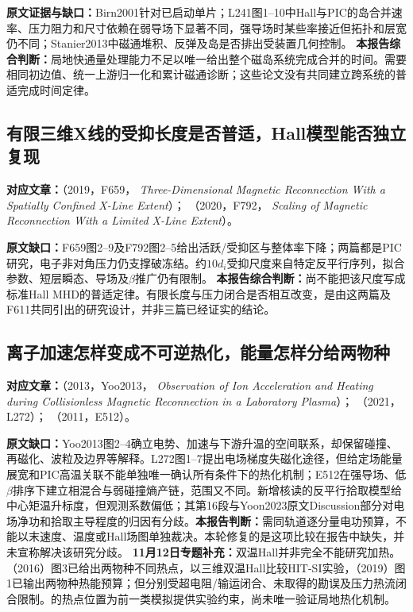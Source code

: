 \textbf{原文证据与缺口：}Birn2001针对已启动单片；L241图1--10中Hall与PIC的岛合并速率、压力阻力和尺寸依赖在弱导场下显著不同，强导场时某些率接近但拓扑和层宽仍不同；Stanier2013中磁通堆积、反弹及岛是否排出受装置几何控制。
\textbf{本报告综合判断：}局地快通量处理能力不足以唯一给出整个磁岛系统完成合并的时间。需要相同初边值、统一上游归一化和累计磁通诊断；这些论文没有共同建立跨系统的普适完成时间定律。

\subsection{有限三维X线的受抑长度是否普适，Hall模型能否独立复现}
\textbf{对应文章：}\citet{F659}（2019，F659，
\emph{Three-Dimensional Magnetic Reconnection With a Spatially Confined X-Line Extent}）；
\citet{F792}（2020，F792，
\emph{Scaling of Magnetic Reconnection With a Limited X-Line Extent}）。

\textbf{原文缺口：}F659图2--9及F792图2--5给出活跃/受抑区与整体率下降；两篇都是PIC研究，电子非对角压力仍支撑破冻结。约$10d_i$受抑尺度来自特定反平行序列，拟合参数、短层瞬态、导场及$\beta$推广仍有限制。
\textbf{本报告综合判断：}尚不能把该尺度写成标准Hall MHD的普适定律。有限长度与压力闭合是否相互改变，是由这两篇及F611共同引出的研究设计，并非三篇已经证实的结论。\citep{F611}

\subsection{离子加速怎样变成不可逆热化，能量怎样分给两物种}
\textbf{对应文章：}\citet{Yoo2013}（2013，Yoo2013，
\emph{Observation of Ion Acceleration and Heating during Collisionless Magnetic Reconnection in a Laboratory Plasma}）；
\citet{L272}（2021，L272）；
\citet{E512}（2011，E512）。

\textbf{原文缺口：}Yoo2013图2--4确立电势、加速与下游升温的空间联系，却保留碰撞、再磁化、波粒及边界等解释。L272图1--7提出电场梯度失磁化途径，但给定场能量展宽和PIC高温关联不能单独唯一确认所有条件下的热化机制；E512在强导场、低$\beta$排序下建立相混合与弱碰撞熵产链，范围又不同。新增核读的\citet{Drake2009Pickup}反平行拾取模型给中心矩温升标度，但观测系数偏低；其第16段与Yoon2023原文Discussion部分对电场净功和拾取主导程度的归因有分歧。\textbf{本报告判断：}需同轨道逐分量电功预算，不能以末速度、温度或Hall场图单独裁决。本轮修复的是这项比较在报告中缺失，并未宣称解决该研究分歧。
\textbf{11月12日专题补充：}双温Hall并非完全不能研究加热。\citet{L223}（2016）图3已给出两物种不同热点，\citet{Kaptanoglu2020}以三维双温Hall比较HIT-SI实验，\citet{TenBarge2019MMS}（2019）图1已输出两物种热能预算；但分别受超电阻/输运闭合、未取得的勘误及压力热流闭合限制。\citet{Tanabe2015MAST}的热点位置为前一类模拟提供实验约束，尚未唯一验证局地热化机制。

